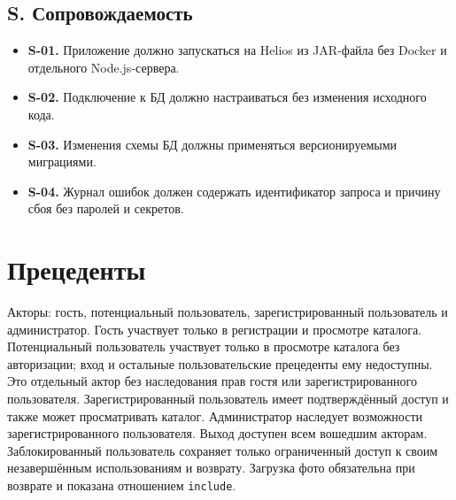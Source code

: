 \documentclass[a4paper,12pt]{article}
\begin{document}
\subsection{S. Сопровождаемость}
\begin{itemize}[itemsep=3pt]
\item \textbf{S-01.} Приложение должно запускаться на Helios из JAR-файла без Docker и отдельного Node.js-сервера.
\item \textbf{S-02.} Подключение к БД должно настраиваться без изменения исходного кода.
\item \textbf{S-03.} Изменения схемы БД должны применяться версионируемыми миграциями.
\item \textbf{S-04.} Журнал ошибок должен содержать идентификатор запроса и причину сбоя без паролей и секретов.
\end{itemize}
\endgroup
\clearpage
\section{Прецеденты}
Акторы: гость, потенциальный пользователь, зарегистрированный пользователь и администратор. Гость участвует только в регистрации и просмотре каталога. Потенциальный пользователь участвует только в просмотре каталога без авторизации; вход и остальные пользовательские прецеденты ему недоступны. Это отдельный актор без наследования прав гостя или зарегистрированного пользователя. Зарегистрированный пользователь имеет подтверждённый доступ и также может просматривать каталог. Администратор наследует возможности зарегистрированного пользователя. Выход доступен всем вошедшим акторам. Заблокированный пользователь сохраняет только ограниченный доступ к своим незавершённым использованиям и возврату. Загрузка фото обязательна при возврате и показана отношением \texttt{include}.
\end{document}
